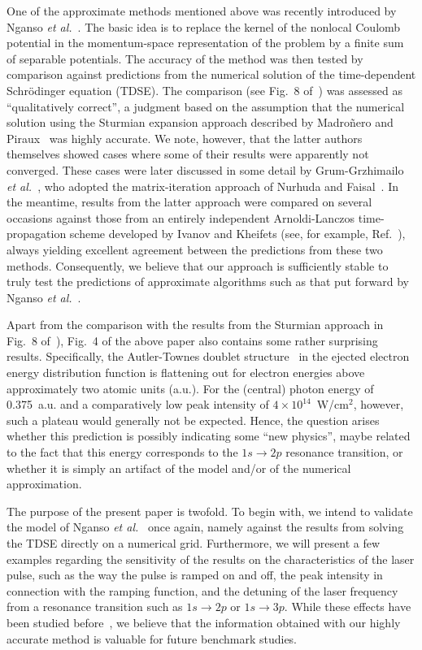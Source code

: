 \documentclass[aps,pra,amsmath,amssymb,showpacs,twocolumn,preprintnumbers,
floatfix,letterpaper]{revtex4-1}
\begin{document}
One of the approximate methods mentioned above was recently introduced by Nganso {\it et al.}~\cite{PhysRevA.83.013401}.
The basic idea is to replace the kernel of the
non\-local Coulomb potential in the momentum-space representation of the problem by a finite sum of separable potentials.
The accuracy of the method was then tested by comparison against predictions from the numerical
solution of the time-dependent Schr\"odinger equation (TDSE).  The comparison (see Fig.~8 of~\cite{PhysRevA.83.013401}) was 
assessed as ``qualitatively correct'', a judgment based on the assumption that the numerical solution using the
Sturmian expansion approach described by Madro\~nero and Piraux~\cite{PhysRevA.80.033409} was highly accurate.
We note, however, that the latter authors themselves showed cases where some of their results were apparently
not converged.  These cases were later discussed in some detail by Grum-Grzhimailo 
{\it et al.}~\cite{PhysRevA.81.043408}, who adopted
the matrix-iteration approach of Nurhuda and Faisal~\cite{PhysRevA.60.3125}.  In the meantime, results from
the latter approach were compared on several occasions against those from an entirely independent
Arnoldi-Lanczos time-propagation scheme developed by Ivanov and Kheifets (see, for example, Ref.~\cite{Pullen:11}),
always yielding excellent agreement between the predictions from these two methods.
Consequently, we believe that our approach is sufficiently stable to truly test the predictions of
approximate algorithms such as that put forward by Nganso {\it et al.}~\cite{PhysRevA.83.013401}.

Apart from the comparison with the results from the Sturmian approach in Fig.~8 of~\cite{PhysRevA.83.013401}),
Fig.~4 of the above paper also contains some rather surprising results.  Specifically,
the Autler-Townes doublet structure~\cite{PhysRev.100.703} in the ejected electron energy distribution function is flattening
out for electron energies above approximately two atomic units (a.u.).  For the (central) photon energy 
of 0.375~a.u. and a comparatively low peak intensity of $4 \times 10^{14}$~W/cm$^2$, however, such a 
plateau would generally not be expected. Hence, the question arises whether this prediction is possibly indicating
some ``new physics'', maybe related to the fact that this energy corresponds to the $1s \to 2p$ resonance transition,
 or whether it is simply an artifact of the model and/or of the numerical approximation.  

The purpose of the present paper is two\-fold.  To begin with, we intend to validate the model of 
Nganso {\it et al.}~\cite{PhysRevA.83.013401} once again, namely against the results from solving the TDSE
directly on a numerical grid.  Furthermore, we will present a few examples regarding the sensitivity
of the results on the characteristics of the laser pulse, such as the way the pulse is ramped on and off,
the peak intensity in connection with the ramping function, and the detuning of the laser frequency from
a resonance transition such as $1s \to 2p$ or $1s \to 3p$.  While these effects have been studied 
before~\cite{otherpapers}, we believe that the information obtained with our highly accurate method is valuable
for future benchmark studies.
\end{document}
